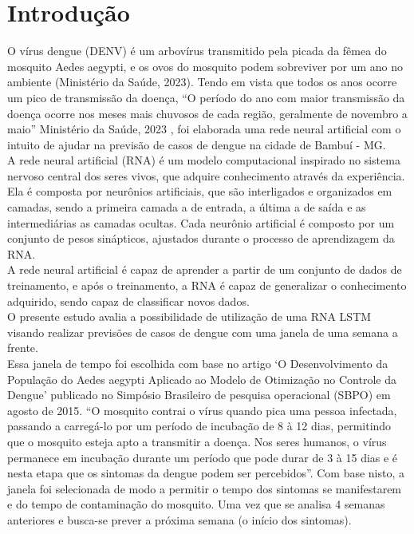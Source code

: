 \documentclass[
	article,			%
	12pt,				%
	a4paper,			%
	chapter=TITLE,		%
	section=TITLE,		%
	subsection=TITLE,	%
	subsubsection=TITLE %
	english,			%
	brazil,				%
	sumario=tradicional
	]{abntex2}
\begin{document}
\section{Introdução}

O vírus dengue (DENV) é um arbovírus transmitido pela picada da fêmea do mosquito Aedes aegypti, 
e os ovos do mosquito podem sobreviver por um ano no ambiente (Ministério da Saúde, 2023). 
Tendo em vista que todos os anos ocorre um pico de transmissão da doença, “O período do ano com maior transmissão da doença ocorre nos meses mais chuvosos de cada região, geralmente de novembro a maio” Ministério da Saúde, 2023
, foi elaborada uma rede neural artificial com o intuito de ajudar na previsão de casos de dengue na cidade de Bambuí - MG.
\\
\indent
A rede neural artificial (RNA) é um modelo computacional inspirado no sistema nervoso central dos seres vivos, que adquire conhecimento através da experiência. Ela é composta por neurônios artificiais, que são interligados e organizados em camadas, sendo a primeira camada a de entrada, a última a de saída e as intermediárias as camadas ocultas. Cada neurônio artificial é composto por um conjunto de pesos sinápticos, ajustados durante o processo de aprendizagem da RNA.
\\ \indent A rede neural artificial é capaz de aprender a partir de um conjunto de dados de treinamento, e após o treinamento, a RNA é capaz de generalizar o conhecimento adquirido, sendo capaz de classificar novos dados.
\\ \indent
O presente estudo avalia a possibilidade de utilização de uma RNA LSTM visando realizar previsões de casos de dengue com uma janela de uma semana a frente.
\\ \indent
Essa janela de tempo foi escolhida com base no artigo ‘O Desenvolvimento da População do Aedes aegypti Aplicado ao Modelo de Otimização no Controle da Dengue’ 
publicado no Simpósio Brasileiro de pesquisa operacional (SBPO) em agosto de 2015. 
“O mosquito contrai o vírus quando pica uma pessoa infectada, passando a carregá-lo por um período de incubação de 8 à 12 dias,
 permitindo que o mosquito esteja apto a transmitir a doença. 
 Nos seres humanos, o vírus permanece em incubação durante um período que pode durar de 3 à 15 dias e é nesta etapa que os
 sintomas da dengue podem ser percebidos”. Com base nisto, a janela foi selecionada de modo a permitir o tempo dos sintomas
 se manifestarem e do tempo de contaminação do mosquito. Uma vez que se analisa 4 semanas anteriores e busca-se prever a próxima semana 
 (o início dos sintomas).
\end{document}

